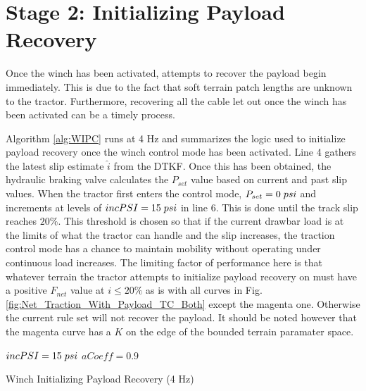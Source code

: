\section{Stage 2: Initializing Payload Recovery}
Once the winch has been activated, attempts to recover the payload begin immediately. This is due to the fact that soft terrain patch lengths are unknown to the tractor. Furthermore, recovering all the cable let out once the winch has been activated can be a timely process.

Algorithm \ref{alg:WIPC} runs at 4 Hz and summarizes the logic used to initialize payload recovery once the winch control mode has been activated. Line 4 gathers the latest slip estimate $\hat{i}$ from the DTKF. Once this has been obtained, the hydraulic braking valve calculates the $P_{set}$ value based on current and past slip values. When the tractor first enters the control mode, $P_{set} = 0\hspace{1mm}psi$ and increments at levels of $incPSI = 15\hspace{1mm}psi$ in line 6. This is done until the track slip reaches $20\%$. This threshold is chosen so that if the current drawbar load is at the limits of what the tractor can handle and the slip increases, the traction control mode has a chance to maintain mobility without operating under continuous load increases. The limiting factor of performance here is that whatever terrain the tractor attempts to initialize payload recovery on must have a positive $F_{net}$ value at $i \leq 20\%$ as is with all curves in Fig. \ref{fig:Net_Traction_With_Payload_TC_Both} except the magenta one. Otherwise the current rule set will not recover the payload. It should be noted however that the magenta curve has a $K$ on the edge of the bounded terrain paramater space. 
\begin{algorithm}[t]
\SetAlgoLined
\vspace{5pt}
 $incPSI = 15\hspace{1mm}psi$\;
 $aCoeff = 0.9$\;
 \caption{Winch Initializing Payload Recovery (4 Hz)}\label{alg:WIPC}
\end{algorithm}
